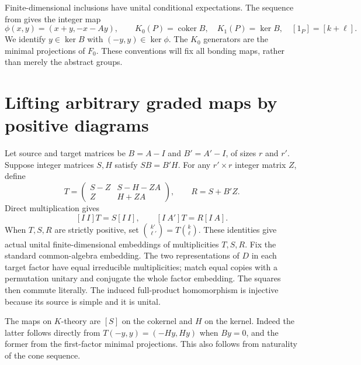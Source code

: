 \documentclass[11pt]{article}
\theoremstyle{remark}\newtheorem{remark}[theorem]{Remark}
\newcommand{\Z}{\mathbb Z}\newcommand{\C}{\mathbb C}
\newcommand{\coker}{\operatorname{coker}}\newcommand{\rank}{\operatorname{rank}}
\begin{document}
Finite-dimensional inclusions have unital conditional expectations.
The sequence from \cite[Theorem 4.1]{FG} gives the integer map
\[
 \phi(x,y)=(x+y,-x-Ay),\qquad
 K_0(P)=\coker B,\quad K_1(P)=\ker B,\quad [1_P]=[k+\ell].
\]
We identify $y\in\ker B$ with $(-y,y)\in\ker\phi$. The $K_0$ generators
are the minimal projections of $F_0$. These conventions will fix all
bonding maps, rather than merely the abstract groups.

\section{Lifting arbitrary graded maps by positive diagrams}
Let source and target matrices be $B=A-I$ and $B'=A'-I$, of sizes
$r$ and $r'$. Suppose integer matrices $S,H$ satisfy $SB=B'H$.
For any $r'\times r$ integer matrix $Z$, define
\begin{equation}\label{eq:T}
 T=\begin{pmatrix}S-Z&S-H-ZA\\Z&H+ZA\end{pmatrix},
 \qquad R=S+B'Z.
\end{equation}
Direct multiplication gives
\begin{equation}\label{eq:squares}
 [I\ I]T=S[I\ I],\qquad [I\ A']T=R[I\ A].
\end{equation}
When $T,S,R$ are strictly positive, set
$\binom{k'}{\ell'}=T\binom{k}{\ell}$. These identities give actual
unital finite-dimensional embeddings of multiplicities $T,S,R$.
Fix the standard common-algebra embedding. The two representations of
$D$ in each target factor have equal irreducible multiplicities; match
equal copies with a permutation unitary and conjugate the whole factor
embedding. The squares then commute literally. The induced full-product
homomorphism is injective because its source is simple and it is unital.

The maps on $K$-theory are $[S]$ on the cokernel and $H$ on the kernel.
Indeed the latter follows directly from
$T(-y,y)=(-Hy,Hy)$ when $By=0$, and the former from the first-factor
minimal projections. This also follows from naturality of the cone sequence.
\end{document}
